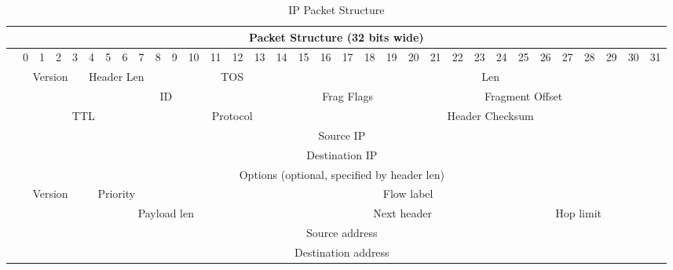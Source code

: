 \begin{landscape}
\begin{table}
\caption{\ac{IP} Packet Structure }
\label{tbl:packet_structure}
\centering
\begin{tabular}{|c||c|c|c|c|c|c|c|c||c|c|c|c|c|c|c|c||c|c|c|c|c|c|c|c||c|c|c|c|c|c|c|c|}
\hline
	\multicolumn{33}{|c|}{\textbf{Packet Structure (32 bits wide)}}\\
\hline
	& 0 & 1 & 2 & 3 & 4 & 5 & 6 & 7 & 8 & 9 & 10 & 11 & 12 & 13 & 14 & 15 & 16 & 17 & 18 & 19 & 20 & 21 & 22 & 23 & 24 & 25 & 26 & 27 & 28 & 29 & 30 & 31\\
\hline
\hline
	\multirow{6}{*}{\rotatebox{90}{\textbf{IPv4}}}
		& \multicolumn{4}{|c|}{Version} & \multicolumn{4}{|c|}{Header Len} & \multicolumn{8}{|c|}{TOS} & \multicolumn{16}{|c|}{Len}\\
		\cline{2-33}
		& \multicolumn{16}{|c|}{ID} & \multicolumn{3}{|c|}{Frag Flags} & \multicolumn{13}{|c|}{Fragment Offset}\\
		\cline{2-33}
		& \multicolumn{8}{|c|}{TTL} & \multicolumn{8}{|c|}{Protocol} & \multicolumn{16}{|c|}{Header Checksum}\\
		\cline{2-33}
		& \multicolumn{32}{|c|}{Source IP}\\
		\cline{2-33}
		& \multicolumn{32}{|c|}{Destination IP}\\
		\cline{2-33}
		& \multicolumn{32}{|c|}{Options (optional, specified by header len)}\\
\hline
\hline
	\multirow{10}{*}{\rotatebox{90}{\textbf{IPv6}}}
		& \multicolumn{4}{|c|}{Version} & \multicolumn{4}{|c|}{Priority} & \multicolumn{24}{|c|}{Flow label}\\
		\cline{2-33}
		& \multicolumn{16}{|c|}{Payload len} & \multicolumn{8}{|c|}{Next header} & \multicolumn{8}{|c|}{Hop limit}\\
		\cline{2-33}
		& \multicolumn{32}{|c|}{\multirow{4}{*}{Source address}}\\
		& \multicolumn{32}{|c|}{}\\
		& \multicolumn{32}{|c|}{}\\
		& \multicolumn{32}{|c|}{}\\
		\cline{2-33}
		& \multicolumn{32}{|c|}{\multirow{4}{*}{Destination address}}\\
		& \multicolumn{32}{|c|}{}\\
		& \multicolumn{32}{|c|}{}\\
		& \multicolumn{32}{|c|}{}\\
\hline
\end{tabular}
\end{table}
\end{landscape}

